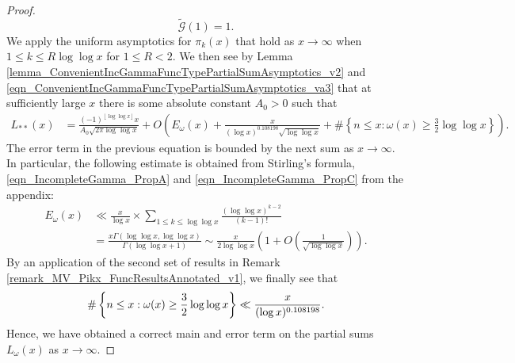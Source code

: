 \documentclass[11pt,reqno,a4letter]{article}
\numberwithin{figure}{section}
\numberwithin{table}{section}
\newcommand{\floor}[1]{\left\lfloor #1 \right\rfloor}
\theoremstyle{plain}
\numberwithin{theorem}{section}
\theoremstyle{definition}
\begin{document}
\begin{proof}
\[     \widetilde{\mathcal{G}}(1) = 1. 
\]
We apply the uniform asymptotics for $\pi_k(x)$ that hold as $x \rightarrow \infty$ when 
$1 \leq k \leq R \log\log x$ for $1 \leq R < 2$. We then see 
by Lemma \ref{lemma_ConvenientIncGammaFuncTypePartialSumAsymptotics_v2} 
and \eqref{eqn_ConvenientIncGammaFuncTypePartialSumAsymptotics_va3} that at sufficiently large $x$ 
there is some absolute constant $A_0 > 0$ such that 
\begin{align*}
L_{\ast\ast}(x) & = \frac{(-1)^{\floor{\log\log x}} x}{A_0 \sqrt{2\pi \log\log x}} + 
     O\left(E_{\omega}(x) + 
     \frac{x}{(\log x)^{0.108198} \sqrt{\log\log x}} + 
     \#\left\{n \leq x: \omega(x) \geq \frac{3}{2}\log\log x\right\}\right). 
\end{align*} 
The error term in the previous equation 
is bounded by the next sum as $x \rightarrow \infty$. 
In particular, the following estimate is obtained from Stirling's formula, 
\eqref{eqn_IncompleteGamma_PropA} and 
\eqref{eqn_IncompleteGamma_PropC} from the appendix: 
\begin{align*} 
E_{\omega}(x) & \ll \frac{x}{\log x} \times 
     \sum_{1 \leq k \leq \log\log x} \frac{(\log\log x)^{k-2}}{(k-1)!} \\ 
     & = 
     \frac{x \Gamma(\log\log x, \log\log x)}{\Gamma(\log\log x + 1)} 
     \sim \frac{x}{2\log\log x} \left(1 + O\left(\frac{1}{\sqrt{\log\log x}}\right)\right). 
\end{align*}
By an application of the second set of results in 
Remark \ref{remark_MV_Pikx_FuncResultsAnnotated_v1}, we finally see that 
\[
\#\left\{n \leq x: \omega(x) \geq \frac{3}{2}\log\log x\right\} \ll 
     \frac{x}{(\log x)^{0.108198}}. 
     \qedhere 
\] 
Hence, we have obtained a correct main and error term on the partial sums $L_{\omega}(x)$ as 
$x \rightarrow \infty$. 
\end{proof}
\end{document}
